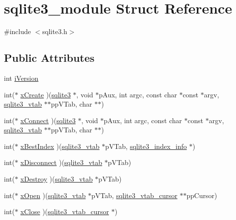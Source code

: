 \hypertarget{structsqlite3__module}{\section{sqlite3\-\_\-module Struct Reference}
\label{structsqlite3__module}
}


{\ttfamily \#include $<$sqlite3.\-h$>$}

\subsection*{Public Attributes}
\begin{DoxyCompactItemize}
\item 
int \hyperlink{structsqlite3__module_a42b11d080dc205aea43581b18f925afe}{i\-Version}
\item 
int($\ast$ \hyperlink{structsqlite3__module_a95e327c9d32abd731013395d9e12b8f9}{x\-Create} )(\hyperlink{structsqlite3}{sqlite3} $\ast$, void $\ast$p\-Aux, int argc, const char $\ast$const $\ast$argv, \hyperlink{structsqlite3__vtab}{sqlite3\-\_\-vtab} $\ast$$\ast$pp\-V\-Tab, char $\ast$$\ast$)
\item 
int($\ast$ \hyperlink{structsqlite3__module_acdd9ccc4a6acff230b2d579172ae32d0}{x\-Connect} )(\hyperlink{structsqlite3}{sqlite3} $\ast$, void $\ast$p\-Aux, int argc, const char $\ast$const $\ast$argv, \hyperlink{structsqlite3__vtab}{sqlite3\-\_\-vtab} $\ast$$\ast$pp\-V\-Tab, char $\ast$$\ast$)
\item 
int($\ast$ \hyperlink{structsqlite3__module_a66577e230ca8de525b30ee6f287eafb1}{x\-Best\-Index} )(\hyperlink{structsqlite3__vtab}{sqlite3\-\_\-vtab} $\ast$p\-V\-Tab, \hyperlink{structsqlite3__index__info}{sqlite3\-\_\-index\-\_\-info} $\ast$)
\item 
int($\ast$ \hyperlink{structsqlite3__module_a5dbaa6ff075eaff25ccfddaedba06934}{x\-Disconnect} )(\hyperlink{structsqlite3__vtab}{sqlite3\-\_\-vtab} $\ast$p\-V\-Tab)
\item 
int($\ast$ \hyperlink{structsqlite3__module_a296dae8dadd4eb1f7d0f1187650c7aa5}{x\-Destroy} )(\hyperlink{structsqlite3__vtab}{sqlite3\-\_\-vtab} $\ast$p\-V\-Tab)
\item 
int($\ast$ \hyperlink{structsqlite3__module_a2cb9f8c149617189efa6ceec0a3211e9}{x\-Open} )(\hyperlink{structsqlite3__vtab}{sqlite3\-\_\-vtab} $\ast$p\-V\-Tab, \hyperlink{structsqlite3__vtab__cursor}{sqlite3\-\_\-vtab\-\_\-cursor} $\ast$$\ast$pp\-Cursor)
\item 
int($\ast$ \hyperlink{structsqlite3__module_a514c66634a5297ca9879947fa6f8f10f}{x\-Close} )(\hyperlink{structsqlite3__vtab__cursor}{sqlite3\-\_\-vtab\-\_\-cursor} $\ast$)
$$
\end{DoxyCompactItemize}
